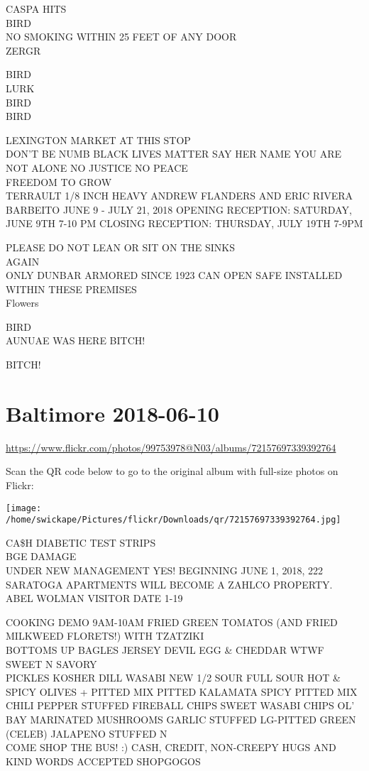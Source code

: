 \documentclass[10pt,letterpaper]{article}
\begin{document}
CASPA HITS\\
BIRD\\
NO SMOKING WITHIN 25 FEET OF ANY DOOR\\
ZERGR

BIRD\\
LURK\\
BIRD\\
BIRD

LEXINGTON MARKET AT THIS STOP\\
DON'T BE NUMB BLACK LIVES MATTER SAY HER NAME YOU ARE NOT ALONE NO JUSTICE NO PEACE\\
FREEDOM TO GROW\\
TERRAULT 1/8 INCH HEAVY ANDREW FLANDERS AND ERIC RIVERA BARBEITO JUNE 9 {-} JULY 21, 2018 OPENING RECEPTION: SATURDAY, JUNE 9TH 7{-}10 PM CLOSING RECEPTION: THURSDAY, JULY 19TH 7{-}9PM

PLEASE DO NOT LEAN OR SIT ON THE SINKS\\
AGAIN\\
ONLY DUNBAR ARMORED SINCE 1923 CAN OPEN SAFE INSTALLED WITHIN THESE PREMISES\\
Flowers

BIRD\\
AUNUAE WAS HERE BITCH!

BITCH!


\section*{Baltimore 2018-06-10}

\url{https://www.flickr.com/photos/99753978@N03/albums/72157697339392764}

Scan the QR code below to go to the original album with full-size photos on Flickr:

\texttt{[image: /home/swickape/Pictures/flickr/Downloads/qr/72157697339392764.jpg]}


CA\$H DIABETIC TEST STRIPS\\
BGE DAMAGE\\
UNDER NEW MANAGEMENT YES!  BEGINNING JUNE 1, 2018, 222 SARATOGA APARTMENTS WILL BECOME A ZAHLCO PROPERTY.\\
ABEL WOLMAN VISITOR DATE 1{-}19

COOKING DEMO 9AM{-}10AM FRIED GREEN TOMATOS (AND FRIED MILKWEED FLORETS!) WITH TZATZIKI\\
BOTTOMS UP BAGLES JERSEY DEVIL EGG \& CHEDDAR WTWF SWEET N SAVORY\\
PICKLES KOSHER DILL WASABI NEW 1/2 SOUR FULL SOUR HOT \& SPICY OLIVES + PITTED MIX PITTED KALAMATA SPICY PITTED MIX CHILI PEPPER STUFFED FIREBALL CHIPS SWEET WASABI CHIPS OL' BAY MARINATED MUSHROOMS GARLIC STUFFED LG{-}PITTED GREEN (CELEB) JALAPENO STUFFED N\\
COME SHOP THE BUS!  :) CASH, CREDIT, NON{-}CREEPY HUGS AND KIND WORDS ACCEPTED SHOPGOGOS
\end{document}
